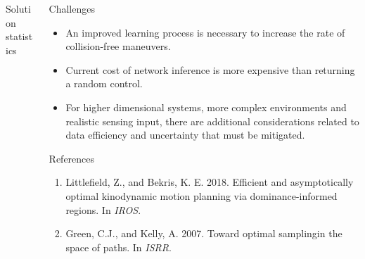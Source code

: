 \begin{columns}[t]
\begin{column}{0.68\textwidth}
\begin{block}{\large Solution statistics}
		\end{block}
	\end{column}
	\begin{column}{0.32\textwidth}
		\begin{block}{\large Challenges}
			\centering
			\begin{itemize}
				\item An improved learning process is necessary to increase the rate of collision-free maneuvers.
				\item Current cost of network inference is more expensive than returning a random control.
				\item For higher dimensional systems, more complex environments and realistic sensing input, there are additional considerations related to data efficiency and uncertainty that must be mitigated.
			\end{itemize}
		\end{block}
		\begin{block}{\large References}
			\begin{enumerate}
				\item Littlefield,  Z.,  and  Bekris,  K.  E. 2018. Efficient  and asymptotically  optimal  kinodynamic  motion  planning  via dominance-informed  regions.    In \textit{IROS}.
				\item Green, C.J., and Kelly, A.  2007.  Toward optimal samplingin the space of paths. In \textit{ISRR}.
			\end{enumerate}
		\end{block}
	\end{column}
\end{columns}